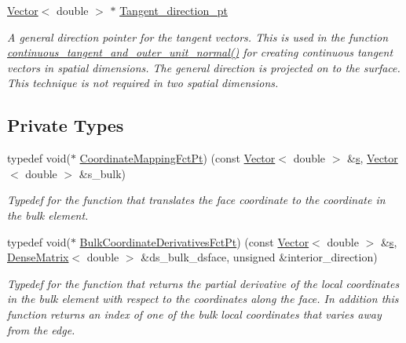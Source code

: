 \begin{DoxyCompactItemize}
\hyperlink{classoomph_1_1Vector}{Vector}$<$ double $>$ $\ast$ \hyperlink{classoomph_1_1FaceElement_a6be4abd12fb4edbd94b7613f62de3593}{Tangent\+\_\+direction\+\_\+pt}
\begin{DoxyCompactList}\small\item\em A general direction pointer for the tangent vectors. This is used in the function \hyperlink{classoomph_1_1FaceElement_a182997beb4a64fde40a47007344913f1}{continuous\+\_\+tangent\+\_\+and\+\_\+outer\+\_\+unit\+\_\+normal()} for creating continuous tangent vectors in spatial dimensions. The general direction is projected on to the surface. This technique is not required in two spatial dimensions. \end{DoxyCompactList}\end{DoxyCompactItemize}
\subsection*{Private Types}
\begin{DoxyCompactItemize}
\item 
typedef void($\ast$ \hyperlink{classoomph_1_1FaceElement_aaa3af8b5d2e9584bdcd9b133990d7591}{Coordinate\+Mapping\+Fct\+Pt}) (const \hyperlink{classoomph_1_1Vector}{Vector}$<$ double $>$ \&\hyperlink{cfortran_8h_ab7123126e4885ef647dd9c6e3807a21c}{s}, \hyperlink{classoomph_1_1Vector}{Vector}$<$ double $>$ \&s\+\_\+bulk)
\begin{DoxyCompactList}\small\item\em Typedef for the function that translates the face coordinate to the coordinate in the bulk element. \end{DoxyCompactList}\item 
typedef void($\ast$ \hyperlink{classoomph_1_1FaceElement_a67356b9329923767ab8f13fed85f7f88}{Bulk\+Coordinate\+Derivatives\+Fct\+Pt}) (const \hyperlink{classoomph_1_1Vector}{Vector}$<$ double $>$ \&\hyperlink{cfortran_8h_ab7123126e4885ef647dd9c6e3807a21c}{s}, \hyperlink{classoomph_1_1DenseMatrix}{Dense\+Matrix}$<$ double $>$ \&ds\+\_\+bulk\+\_\+dsface, unsigned \&interior\+\_\+direction)
\begin{DoxyCompactList}\small\item\em Typedef for the function that returns the partial derivative of the local coordinates in the bulk element with respect to the coordinates along the face. In addition this function returns an index of one of the bulk local coordinates that varies away from the edge. \end{DoxyCompactList}\end{DoxyCompactItemize}
